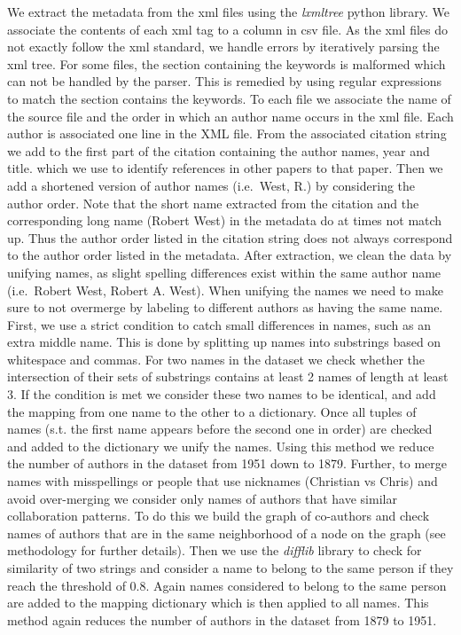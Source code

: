 \documentclass[article,twocolumn]{IEEEtran}
\begin{document}
We extract the metadata from the xml files using the \emph{lxmltree}
python library. We associate the contents of each xml tag to a column in
csv file. As the xml files do not exactly follow the xml standard, we
handle errors by iteratively parsing the xml tree. For some files, the
section containing the keywords is malformed which can not be handled by
the parser. This is remedied by using regular expressions to match the
section contains the keywords. To each file we associate the name of the
source file and the order in which an author name occurs in the xml
file. Each author is associated one line in the XML file. From the
associated citation string we add to the first part of the citation
containing the author names, year and title. which we use to identify
references in other papers to that paper. Then we add a shortened
version of author names (i.e.~West, R.) by considering the author order.
Note that the short name extracted from the citation and the
corresponding long name (Robert West) in the metadata do at times not
match up. Thus the author order listed in the citation string does not
always correspond to the author order listed in the metadata. After
extraction, we clean the data by unifying names, as slight spelling
differences exist within the same author name (i.e.~Robert West, Robert
A. West). When unifying the names we need to make sure to not overmerge
by labeling to different authors as having the same name. First, we use
a strict condition to catch small differences in names, such as an extra
middle name. This is done by splitting up names into substrings based on
whitespace and commas. For two names in the dataset we check whether the
intersection of their sets of substrings contains at least 2 names of
length at least 3. If the condition is met we consider these two names
to be identical, and add the mapping from one name to the other to a
dictionary. Once all tuples of names (s.t. the first name appears before
the second one in order) are checked and added to the dictionary we
unify the names. Using this method we reduce the number of authors in
the dataset from 1951 down to 1879. Further, to merge names with
misspellings or people that use nicknames (Christian vs Chris) and avoid
over-merging we consider only names of authors that have similar
collaboration patterns. To do this we build the graph of co-authors and
check names of authors that are in the same neighborhood of a node on
the graph (see methodology for further details). Then we use the
\emph{difflib} library to check for similarity of two strings and
consider a name to belong to the same person if they reach the threshold
of 0.8. Again names considered to belong to the same person are added to
the mapping dictionary which is then applied to all names. This method
again reduces the number of authors in the dataset from 1879 to 1951.
\end{document}
